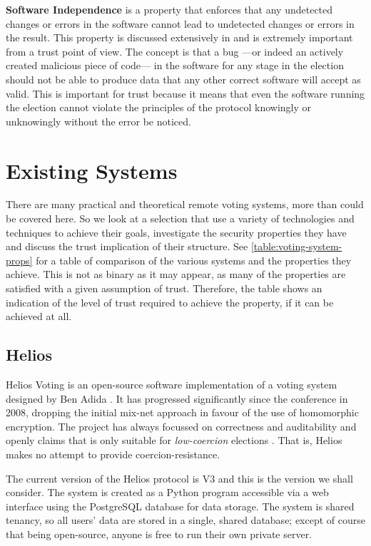 \textbf{Software Independence} is a property that enforces that any undetected changes or errors in the software cannot lead to undetected changes or errors in the result. This property is discussed extensively in \cite{rivestNotionSoftwareIndependence2008} and is extremely important from a trust point of view. The concept is that a bug ---or indeed an actively created malicious piece of code--- in the software for any stage in the election should not be able to produce data that any other correct software will accept as valid. This is important for trust because it means that even the software running the election cannot violate the principles of the protocol knowingly or unknowingly without the error be noticed.

\section{Existing Systems}
\label{ch:ev:existing}

There are many practical and theoretical remote voting systems, more than could be covered here. So we look at a selection that use a variety of technologies and techniques to achieve their goals, investigate the security properties they have and discuss the trust implication of their structure. See \autoref{table:voting-system-props} for a table of comparison of the various systems and the properties they achieve. This is not as binary as it may appear, as many of the properties are satisfied with a given assumption of trust. Therefore, the table shows an indication of the level of trust required to achieve the property, if it can be achieved at all.

\subsection{Helios}

Helios Voting is an open-source software implementation of a voting system designed by Ben Adida \cite{adidaHeliosWebBasedOpenAudit2008}. It has progressed significantly since the conference in 2008, dropping the initial mix-net approach in favour of the use of homomorphic encryption. The project has always focussed on correctness and auditability and openly claims that is only suitable for \emph{low-coercion} elections \cite{HeliosVotingFAQ}. That is, Helios makes no attempt to provide coercion-resistance.

The current version of the Helios protocol is V3 and this is the version we shall consider. The system is created as a Python program accessible via a web interface using the PostgreSQL database for data storage. The system is shared tenancy, so all users' data are stored in a single, shared database; except of course that being open-source, anyone is free to run their own private server.

